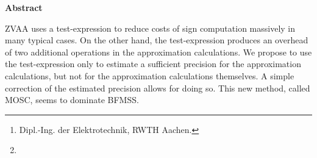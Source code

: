 %
%
\author{\Author\footnote{Dipl.-Ing. der Elektrotechnik, RWTH Aachen.}}
\date{\Date\footnote{\Rev}}
\maketitle
\vfill

\begin{center}
\bf Abstract
\end{center}

\noindent ZVAA uses a test-expression 
to reduce costs of sign computation
massively in many typical cases.
On the other hand, 
the test-expression produces an overhead
of two additional operations
in the approximation calculations.
We propose to use the test-expression 
only to estimate a sufficient precision
for the approximation calculations,
but not for the approximation calculations
themselves.
A simple correction of the estimated precision
allows for doing so.
This new method, called MOSC, seems to dominate BFMSS.

%
%
